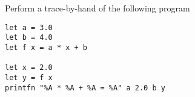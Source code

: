 Perform a trace-by-hand of the following program
\begin{lstlisting}
let a = 3.0
let b = 4.0
let f x = a * x + b

let x = 2.0
let y = f x
printfn "%A * %A + %A = %A" a 2.0 b y
\end{lstlisting}
